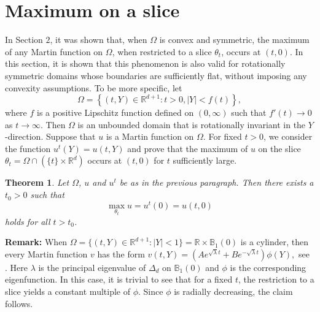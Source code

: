 \documentclass[11pt]{amsart}
\newtheorem{thm}{Theorem}[section]
\theoremstyle{definition}
\theoremstyle{remark}
\begin{document}
\section{Maximum on a slice}
In Section $2$, it was shown that, when $\Omega$ is convex and
symmetric, the maximum of any Martin function on $\Omega$, when restricted to a slice $\theta_t$, occurs at $(t,0)$. In this section, it is shown that this phenomenon is also valid for rotationally symmetric domains whose boundaries are sufficiently flat, without imposing any convexity assumptions. To be more specific, let 
$$\Omega = \left\{(t, Y)\in\mathbb{R}^{d+1}: t>0, |Y| < f(t)\right\},$$
where $f$ is a positive Lipschitz function defined on $(0,\infty)$ such that $f'(t)\to 0$ as $t\to\infty$. Then $\Omega$ is an unbounded domain that is  rotationally invariant in the $Y$-direction. Suppose that $u$ is a Martin function on $\Omega$. For fixed $t>0$, we consider the function $u^t(Y) = u(t, Y)$ and prove that the maximum of $u$ on the slice $\theta_t = \Omega\cap\left(\{t\}\times\mathbb{R}^d\right)$ occurs at $(t, 0)$ for $t$ sufficiently large. 

\begin{thm}
Let $\Omega$, $u$ and $u^t$ be as in the previous paragraph. Then there exists a $t_0>0$ such that  $$\max_{\theta_t}u = u^t(0) = u(t,0)$$
holds for all $t>t_0$.
\end{thm}

\textbf{Remark:} When $\Omega =\{(t, Y)\in\mathbb{R}^{d+1}: |Y| < 1\} = \mathbb{R}\times \mathbb{B}_1(0)$ is a cylinder, then every Martin function $v$ has the form $v(t, Y) = (Ae^{\sqrt{\lambda}t} + Be^{-\sqrt{\lambda}t})\phi(Y),$ see \cite{MI}. Here $\lambda$ is the principal eigenvalue of $\Delta_{d}$ on $\mathbb{B}_1(0)$ and $\phi$ is the corresponding eigenfunction. In this case, it is trivial to see that for a fixed $t$, the restriction to a slice yields a constant multiple of $\phi$. Since $\phi$ is radially decreasing, the claim follows. 
\end{document}
